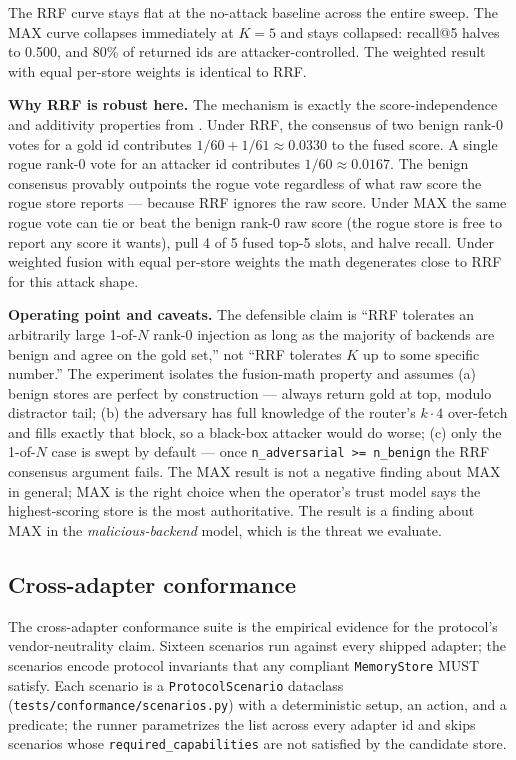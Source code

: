 \documentclass[11pt,letterpaper,twocolumn]{article}
\begin{document}
The RRF curve stays flat at the no-attack baseline across the entire sweep. The MAX curve collapses immediately at $K=5$ and stays collapsed: recall@5 halves to 0.500, and 80\% of returned ids are attacker-controlled. The weighted result with equal per-store weights is identical to RRF.

\textbf{Why RRF is robust here.} The mechanism is exactly the score-independence and additivity properties from . Under RRF, the consensus of two benign rank-0 votes for a gold id contributes $1/60 + 1/61 \approx 0.0330$ to the fused score. A single rogue rank-0 vote for an attacker id contributes $1/60 \approx 0.0167$. The benign consensus provably outpoints the rogue vote regardless of what raw score the rogue store reports --- because RRF ignores the raw score. Under MAX the same rogue vote can tie or beat the benign rank-0 raw score (the rogue store is free to report any score it wants), pull 4 of 5 fused top-5 slots, and halve recall. Under weighted fusion with equal per-store weights the math degenerates close to RRF for this attack shape.

\textbf{Operating point and caveats.} The defensible claim is ``RRF tolerates an arbitrarily large 1-of-$N$ rank-0 injection as long as the majority of backends are benign and agree on the gold set,'' not ``RRF tolerates $K$ up to some specific number.'' The experiment isolates the fusion-math property and assumes (a) benign stores are perfect by construction --- always return gold at top, modulo distractor tail; (b) the adversary has full knowledge of the router's $k \cdot 4$ over-fetch and fills exactly that block, so a black-box attacker would do worse; (c) only the 1-of-$N$ case is swept by default --- once \texttt{n\_adversarial >= n\_benign} the RRF consensus argument fails. The MAX result is not a negative finding about MAX in general; MAX is the right choice when the operator's trust model says the highest-scoring store is the most authoritative. The result is a finding about MAX in the \emph{malicious-backend} model, which is the threat we evaluate.

\subsection{Cross-adapter conformance}
\label{sec:eval-conformance}

The cross-adapter conformance suite is the empirical evidence for the protocol's vendor-neutrality claim. Sixteen scenarios run against every shipped adapter; the scenarios encode protocol invariants that any compliant \texttt{MemoryStore} MUST satisfy. Each scenario is a \texttt{ProtocolScenario} dataclass (\texttt{tests/conformance/scenarios.py}) with a deterministic setup, an action, and a predicate; the runner parametrizes the list across every adapter id and skips scenarios whose \texttt{required\_capabilities} are not satisfied by the candidate store.
\end{document}
